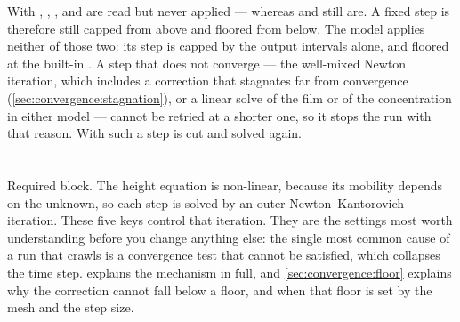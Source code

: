 \begin{note}
  With , , ,
   and  are read but never applied ---
  whereas  and  still are. A fixed step is
  therefore still capped from above and floored from below. The 
  model applies neither of those two: its step is capped by the output
  intervals alone, and floored at the built-in . A step that
  does not converge --- the well-mixed Newton iteration, which includes a
  correction that stagnates far from convergence
  (\cref{sec:convergence:stagnation}), or a linear solve
  of the film or of the concentration in either model --- cannot be retried
  at a shorter one, so it stops the run with that reason. With
   such a step is cut and solved again.
\end{note}

\section{}
\label{sec:ref-numerics:height}

Required block. The height equation is non-linear, because its mobility
depends on the unknown, so each step is solved by an outer Newton--Kantorovich
iteration. These five keys control that iteration. They are the
settings most worth understanding before you change anything else: the single
most common cause of a run that crawls is a convergence test that cannot be
satisfied, which collapses the time step.  explains the
mechanism in full, and \cref{sec:convergence:floor} explains why the
correction cannot fall below a floor, and when that floor is set by the mesh
and the step size.

